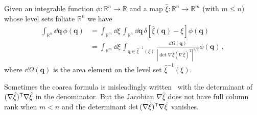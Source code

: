 \begin{theorem}
  Given an integrable function $\phi: \mathbb{R}^n \to \mathbb{R}$ and
  a map $\hat{\xi}: \mathbb{R}^n \to \mathbb{R}^m$ (with $m \leq n$) whose level sets foliate $\mathbb{R}^{n}$ we have
  \begin{equation}
    \begin{aligned}
      \int_{\mathbb{R}^n} \dd{\bm{q}}\, \phi(\bm{q}) &= \int_{\mathbb{R}^m} \dd{\xi}\,\int_{\mathbb{R}^n} \dd{\bm{q}}\, \delta\left[\hat{\xi}(\bm{q}) - \xi\right] \phi(\bm{q})\\
                                                     &= \int_{\mathbb{R}^m} \dd{\xi}\,\int_{\bm{q} \in \hat{\xi}^{-1}(\xi)} \frac{\dd{\Omega(\bm{q})}}{|\det \nabla\hat{\xi}(\nabla\hat{\xi})^T|^{1/2}} \phi(\bm{q})\,,
    \end{aligned}
  \end{equation}
  where $\dd\Omega(\bm{q})$ is the area element on the level set $\hat{\xi}^{-1}(\xi)$.
\end{theorem}

Sometimes the coarea formula is misleadingly written~\cite{hartmann2007,hartmann2007a} with the determinant of $(\nabla\hat{\xi})^\mathsf{T}\nabla\hat{\xi}$ in the denominator.  But the Jacobian $\nabla\hat{\xi}$ does not have full column rank when $m < n$ and the determinant $\det\,(\nabla\hat{\xi})^\mathsf{T}\nabla\hat{\xi}$ vanishes.


